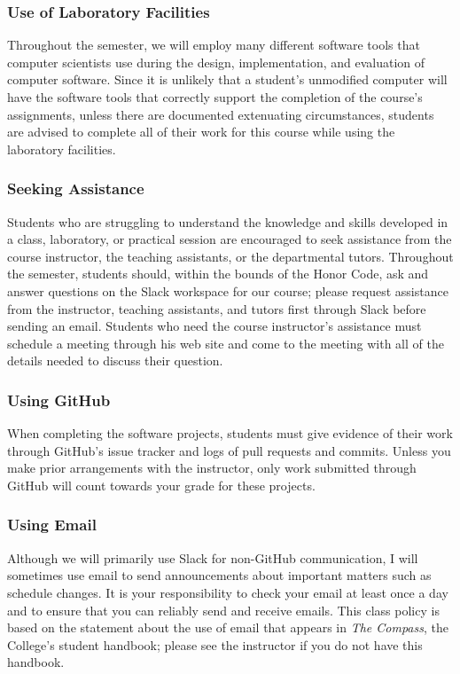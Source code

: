 \documentclass[11pt]{article}
\newcommand{\instructorpronoun}[1]{his}
\begin{document}
\subsubsection*{Use of Laboratory Facilities}

Throughout the semester, we will employ many different software tools that
computer scientists use during the design, implementation, and evaluation of
computer software. Since it is unlikely that a student's unmodified computer
will have the software tools that correctly support the completion of the
course's assignments, unless there are documented extenuating circumstances,
students are advised to complete all of their work for this course while using
the laboratory facilities.

\subsubsection*{Seeking Assistance}

Students who are struggling to understand the knowledge and skills developed in
a class, laboratory, or practical session are encouraged to seek assistance from
the course instructor, the teaching assistants, or the departmental tutors.
Throughout the semester, students should, within the bounds of the Honor Code,
ask and answer questions on the Slack workspace for our course; please request
assistance from the instructor, teaching assistants, and tutors first through
Slack before sending an email. Students who need the course instructor's
assistance must schedule a meeting through \instructorpronoun{} web site and
come to the meeting with all of the details needed to discuss their question.

\subsubsection*{Using GitHub}

When completing the software projects, students must give evidence of their work
through GitHub's issue tracker and logs of pull requests and commits. Unless you
make prior arrangements with the instructor, only work submitted through GitHub
will count towards your grade for these projects.

\subsubsection*{Using Email}

Although we will primarily use Slack for non-GitHub communication, I will
sometimes use email to send announcements about important matters such as
schedule changes. It is your responsibility to check your email at least once a
day and to ensure that you can reliably send and receive emails. This class
policy is based on the statement about the use of email that appears in {\em The
Compass}, the College's student handbook; please see the instructor if you do
not have this handbook.
\end{document}
